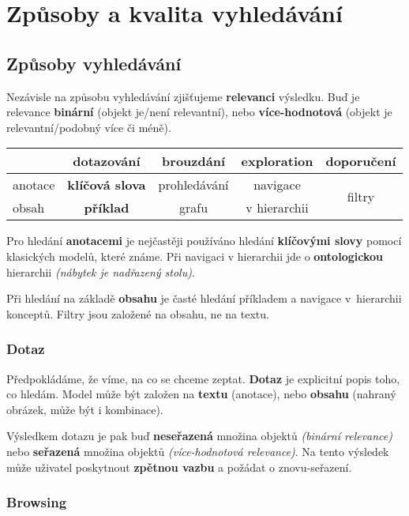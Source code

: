 \section{Způsoby a kvalita vyhledávání}

\subsection{Způsoby vyhledávání}

Nezávisle na způsobu vyhledávání zjišťujeme \textbf{relevanci} výsledku. Buď je relevance \textbf{binární} (objekt je/není relevantní), nebo \textbf{více-hodnotová} (objekt je relevantní/podobný více či méně).

\begin{table}[H]
    \centering
    \begin{tabular}{l|c|c|c|c}
         & dotazování & brouzdání & exploration & doporučení \\
         \hline
        anotace & \textbf{klíčová slova} & prohledávání & navigace  & \multirow{2}{*}{filtry} \\
        obsah & \textbf{příklad} & grafu & v hierarchii &
    \end{tabular}
\end{table}

Pro hledání \textbf{anotacemi} je nejčastěji používáno hledání \textbf{klíčovými slovy} pomocí klasických modelů, které známe. Při navigaci v hierarchii jde o \textbf{ontologickou} hierarchii \textit{(nábytek je nadřazený stolu)}.

Při hledání na základě \textbf{obsahu} je časté hledání příkladem a navigace v~hierarchii konceptů. Filtry jsou založené na obsahu, ne na textu.

\subsubsection{Dotaz}

Předpokládáme, že víme, na co se chceme zeptat. \textbf{Dotaz} je explicitní popis toho, co hledám. Model může být založen na \textbf{textu} (anotace), nebo \textbf{obsahu} (nahraný obrázek, může být i kombinace).

Výsledkem dotazu je pak buď \textbf{neseřazená} množina objektů \textit{(binární relevance)} nebo \textbf{seřazená} množina objektů \textit{(více-hodnotová relevance)}. Na tento výsledek může uživatel poskytnout \textbf{zpětnou vazbu} a požádat o znovu-seřazení.

\subsubsection{Browsing}

